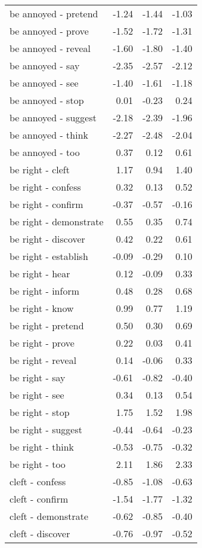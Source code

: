 \begin{longtable}{lrrr}
  be annoyed - pretend & -1.24 & -1.44 & -1.03 \\ 
  be annoyed - prove & -1.52 & -1.72 & -1.31 \\ 
  be annoyed - reveal & -1.60 & -1.80 & -1.40 \\ 
  be annoyed - say & -2.35 & -2.57 & -2.12 \\ 
  be annoyed - see & -1.40 & -1.61 & -1.18 \\ 
  be annoyed - stop & 0.01 & -0.23 & 0.24 \\ 
  be annoyed - suggest & -2.18 & -2.39 & -1.96 \\ 
  be annoyed - think & -2.27 & -2.48 & -2.04 \\ 
  be annoyed - too & 0.37 & 0.12 & 0.61 \\ 
  be right - cleft & 1.17 & 0.94 & 1.40 \\ 
  be right - confess & 0.32 & 0.13 & 0.52 \\ 
  be right - confirm & -0.37 & -0.57 & -0.16 \\ 
  be right - demonstrate & 0.55 & 0.35 & 0.74 \\ 
  be right - discover & 0.42 & 0.22 & 0.61 \\ 
  be right - establish & -0.09 & -0.29 & 0.10 \\ 
  be right - hear & 0.12 & -0.09 & 0.33 \\ 
  be right - inform & 0.48 & 0.28 & 0.68 \\ 
  be right - know & 0.99 & 0.77 & 1.19 \\ 
  be right - pretend & 0.50 & 0.30 & 0.69 \\ 
  be right - prove & 0.22 & 0.03 & 0.41 \\ 
  be right - reveal & 0.14 & -0.06 & 0.33 \\ 
  be right - say & -0.61 & -0.82 & -0.40 \\ 
  be right - see & 0.34 & 0.13 & 0.54 \\ 
  be right - stop & 1.75 & 1.52 & 1.98 \\ 
  be right - suggest & -0.44 & -0.64 & -0.23 \\ 
  be right - think & -0.53 & -0.75 & -0.32 \\ 
  be right - too & 2.11 & 1.86 & 2.33 \\ 
  cleft - confess & -0.85 & -1.08 & -0.63 \\ 
  cleft - confirm & -1.54 & -1.77 & -1.32 \\ 
  cleft - demonstrate & -0.62 & -0.85 & -0.40 \\ 
  cleft - discover & -0.76 & -0.97 & -0.52 \\ 

\end{longtable}
